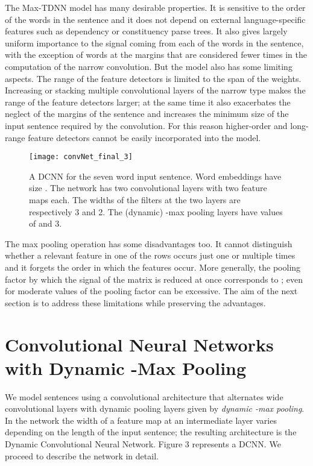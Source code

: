 \documentclass[11pt]{article}
\begin{document}
The Max-TDNN model has many desirable properties. It is sensitive to the order of the words in the sentence and it does not depend on external language-specific features such as dependency or constituency parse trees. It also gives largely uniform importance to the signal coming from each of the words in the sentence, with the exception of words at the margins that are considered fewer times in the computation of the narrow convolution. But the model also has some limiting aspects. The range of the feature detectors is limited to the span  of the weights. Increasing  or stacking multiple convolutional layers of the narrow type makes the range of the feature detectors larger; at the same time it also exacerbates the neglect of the margins of the sentence and increases the minimum size  of the input sentence required by the convolution. For this reason higher-order and long-range feature detectors cannot be easily incorporated into the model. 
\begin{figure}
\label{cnnsm}
\vspace{-0.8cm}
{\texttt{[image: convNet\_final\_3]}}
\caption{A DCNN for the seven word input sentence. Word embeddings have size . The network has two convolutional layers with two feature maps each. The widths of the filters at the two layers are respectively 3 and 2. The (dynamic) -max pooling layers have values  of  and 3.   }
\vspace{-0.3cm}
\end{figure}
The max pooling operation has some disadvantages too. It cannot distinguish whether a relevant feature in one of the rows occurs just one or multiple times and it forgets the order in which the features occur. More generally, the pooling factor by which the signal of the matrix is reduced at once corresponds to ; even for moderate values of  the pooling factor can be excessive.
The aim of the next section is to address these limitations while preserving the  advantages.



\section{Convolutional Neural Networks with Dynamic -Max Pooling}
\label{convdyn}

We model sentences using a convolutional architecture that alternates wide convolutional layers with dynamic pooling layers given by  \emph{dynamic -max pooling}. In the network the width of a feature map at an intermediate layer varies depending on the length of the input sentence; the resulting architecture is the Dynamic Convolutional Neural Network. Figure 3 represents a DCNN. We proceed to describe the network in detail.
\end{document}

